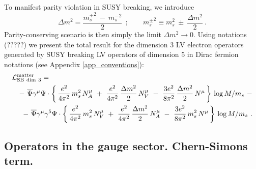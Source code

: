 \documentclass[12pt]{revtex4}
\begin{document}
	To manifest parity violation in SUSY breaking, we introduce 
\begin{equation}
\Delta m^2 = \frac{ {m_{s}^+}^2 ~ - ~ {m_{s}^-}^2 }
  {                  2                  }~~;
\qquad
{m_{s}^\pm}^2 \equiv m_s^2 ~\pm~ \frac{\Delta m^2}{2}~.
\end{equation}
	Parity-conserving scenario is then simply the limit
	$ \Delta m^2 \to 0 $.
	Using notations (?????) we present the total result for the 
	dimension 3 LV electron operators generated by SUSY breaking 
	LV operators of dimension 5 in Dirac fermion notations
	(see Appendix \ref{app_conventions}):
\begin{eqnarray}
\nonumber
\lefteqn{
        \mathcal{L}_{\rm{SB\ dim\ 3}}^{\rm matter} = 
} \\
\nonumber
        &&
-~
\overline{\Psi} \gamma^\mu \Psi \cdot
\left\{\,
        \frac{e^2}{4\pi^2}\, m_s^2\, N_A^\mu 
~+~
\frac{e^2}{4\pi^2}\, \frac{\Delta m^2}{2}\, N_V^\mu 
~-~
\frac{3e^2}{8\pi^2}\, \frac{\Delta m^2}{2}\, N^\mu
       \,
\right\}\, \log M/m_s 
~-
\\
\label{LV_induced_dim3}
&&
-~
\overline{\Psi} \gamma^\mu \gamma^5 \Psi \cdot
\left\{\,
        \frac{e^2}{4\pi^2}\, m_s^2\, N_V^\mu 
~+~
\frac{e^2}{4\pi^2}\, \frac{\Delta m^2}{2}\, N_A^\mu 
~-~
\frac{3e^2}{8\pi^2}\, m_s^2\, N^\mu
       \,
\right\}\, \log M/m_s~.
\end{eqnarray}



\subsection{Operators in the gauge sector. Chern-Simons term.}
\label{SB_gauge_sector}
    
\end{document}
